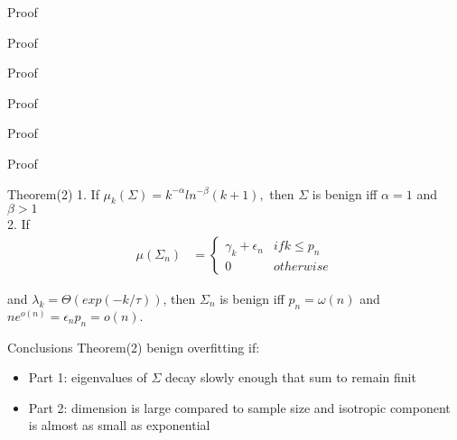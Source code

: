 \documentclass{beamer}
\begin{document}
\begin{frame}{Proof}
\end{frame}

\begin{frame}{Proof}
\end{frame}

\begin{frame}{Proof}
\end{frame}

\begin{frame}{Proof}
\end{frame}

\begin{frame}{Proof}
\end{frame}

\begin{frame}{Proof}
\end{frame}


\begin{frame}{Theorem(2)}
1. If $\mu_k(\Sigma) = k^{-\alpha}ln^{-\beta}(k+1), $ then $\Sigma$ is benign iff $\alpha = 1$ and $\beta > 1$\\

\vspace*{0.3 cm} 2. If
\begin{align*}
\mu(\Sigma_n) &= 
\begin{cases*}
\gamma_k + \epsilon_n & if k \leq p_n \\
0 & otherwise
\end{cases*}
\end{align*}

and $\lambda_k = \Theta(exp(-k/\tau))$, then $\Sigma_n$ is benign iff $p_n = \omega(n)$ and $ne^{o(n)} = \epsilon_np_n = o(n).$
\end{frame}


\begin{frame}{Conclusions Theorem(2)}
	benign overfitting if:
\begin{itemize}
	\item Part 1: eigenvalues of $\Sigma$ decay slowly enough that sum to remain finit
	\item Part 2: dimension is large compared to sample size and isotropic component is almost as small as  exponential
\end{itemize}
\end{frame}
\end{document}
